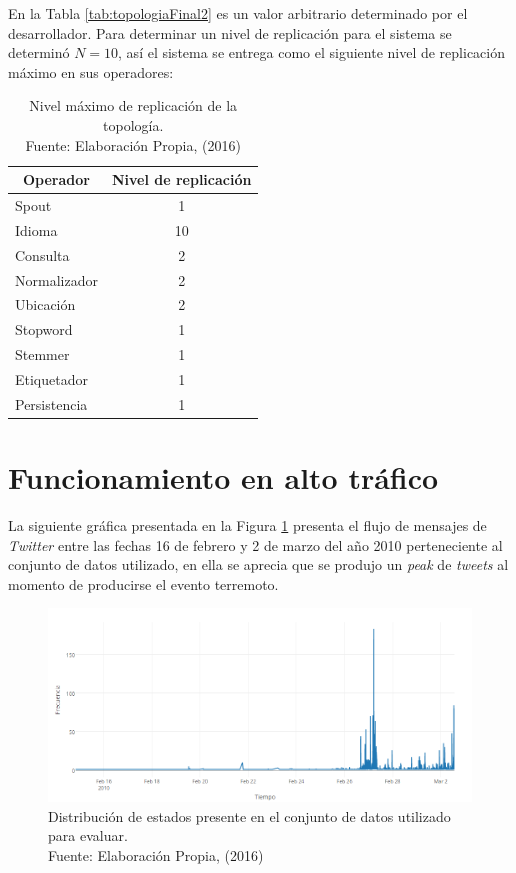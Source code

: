 En la Tabla \ref{tab:topologiaFinal2} es un valor arbitrario determinado por el desarrollador. Para determinar un nivel de replicación para el sistema se determinó $N = 10$, así el sistema se entrega como el siguiente nivel de replicación máximo en sus operadores:

\begin{table}[H]
\centering
\caption[Nivel máximo de replicación de la topología.]{Nivel máximo de replicación de la topología.\\Fuente: Elaboración Propia, (2016)}
\label{tab:topologiaFinal}
\begin{tabular}{|l|c|}
\hline
\multicolumn{1}{|c|}{\textbf{Operador}} & \textbf{Nivel de replicación} \\ \hline
Spout & 1 \\ \hline
Idioma & 10 \\ \hline
Consulta & 2 \\ \hline
Normalizador & 2 \\ \hline
Ubicación & 2 \\ \hline
Stopword & 1 \\ \hline
Stemmer & 1 \\ \hline
Etiquetador & 1 \\ \hline
Persistencia & 1 \\ \hline
\end{tabular}
\end{table} 

\section{Funcionamiento en alto tráfico}
\label{sec:AltoTrafico}

La siguiente gráfica presentada en la Figura \ref{fig:graficoDeTweets} presenta el flujo de mensajes de \textit{Twitter} entre las fechas 16 de febrero y 2 de marzo del año 2010 perteneciente al conjunto de datos utilizado, en ella se aprecia que se produjo un \textit{peak} de \textit{tweets} al momento de producirse el evento terremoto.

\begin{figure}[H]
        \centering
        \captionsetup{justification=centering}
        \includegraphics[scale=0.6]{images/GraficoTweetsHastaEventoZoom1.png}
        \caption[Distribución de eventos presente en el conjunto de datos utilizado para evaluar.]{Distribución de estados presente en el conjunto de datos utilizado para evaluar.\\Fuente: Elaboración Propia, (2016)}
        \label{fig:graficoDeTweets}
\end{figure}

